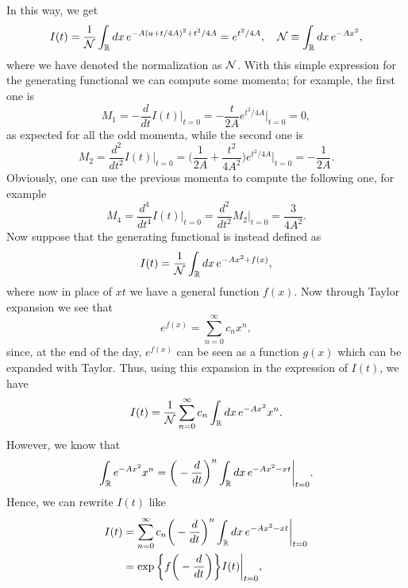 In this way, we get 
\begin{equation}
    I(t) = \frac{1}{\mathcal{N}}\int_{\mathbb{R}} dx\,e^{-A(a + t/4A)^2 + t^2/4A} = e^{t^2/4A}, \quad \mathcal{N} \equiv \int_{\mathbb{R}} dx\,e^{-Ax^2},
\end{equation}
where we have denoted the normalization as $\mathcal{N}$. With this simple expression for the generating functional we can compute some momenta; for example, the first one is 
\begin{equation}
    M_1 = -\frac{d}{dt}I(t)\bigg|_{t = 0} = -\frac{t}{2A}e^{t^2/4A}\bigg|_{t = 0} = 0,
\end{equation}
as expected for all the odd momenta, while the second one is 
\begin{equation}
    M_2 = \frac{d^2}{dt^2}I(t)\bigg|_{t = 0} = \bigg(\frac{1}{2A} + \frac{t^2}{4A^2}\bigg)e^{t^2/4A}\bigg|_{t = 0} = -\frac{1}{2A}.
\end{equation}
Obviously, one can use the previous momenta to compute the following one, for example 
\begin{equation}
    M_4 = \frac{d^4}{dt^4}I(t)\bigg|_{t = 0} = \frac{d^2}{dt^2}M_2\bigg|_{t = 0} = \frac{3}{4A^2}.
\end{equation}
Now suppose that the generating functional is instead defined as 
\begin{equation}
    I(t) = \frac{1}{\mathcal{N}}\int_{\mathbb{R}} dx\,e^{-Ax^2 + f(x)},
\end{equation}
where now in place of $xt$ we have a general function $f(x)$. Now through Taylor expansion we see that 
\begin{equation}
    e^{f(x)} = \sum_{n=0}^\infty c_n x^n,
\end{equation}
since, at the end of the day, $e^{f(x)}$ can be seen as a function $g(x)$ which can be expanded with Taylor. Thus, using this expansion in the expression of $I(t)$, we have 
\begin{equation}
    I(t) = \frac{1}{\mathcal{N}}\sum_{n=0}^\infty c_n\int_{\mathbb{R}} dx\,e^{-Ax^2}x^n.
\end{equation}
However, we know that 
\begin{equation}
    \int_{\mathbb{R}} e^{-Ax^2}x^n = \bigg(-\frac{d}{dt}\bigg)^n\int_{\mathbb{R}} dx\,e^{-Ax^2 - xt}\bigg|_{t = 0}.
\end{equation}
Hence, we can rewrite $I(t)$ like 
\begin{equation}
    \begin{split}
        I(t) &= \sum_{n=0}^\infty c_n\bigg(-\frac{d}{dt}\bigg)^n\int_{\mathbb{R}} dx\,e^{-Ax^2 - xt}\bigg|_{t = 0} \\
        &= \exp{\bigg\{f\bigg(-\frac{d}{dt}\bigg)\bigg\}}I(t)\bigg|_{t = 0},
    \end{split}
\end{equation}
